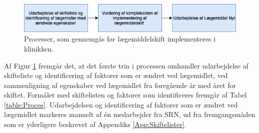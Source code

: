\begin{figure}[H]\centering	\includegraphics[width=1\textwidth]{billeder/proces.png} 
	\caption{Processer, som gennemgås før lægemiddelskift implementeres i klinikken.}\label{fig:Proces}  
\end{figure}

Af Figur \ref{fig:Proces} fremgår det, at det første trin i processen omhandler udarbejdelse af skifteliste og identificering af faktorer som er ændret ved lægemidlet, ved sammenligning af egenskaber ved lægemidlet fra foregående år med året for skiftet. Formålet med skiftelisten og faktorer som identificeres fremgår af Tabel \ref{table:Proces}. Udarbejdelsen og identificering af faktorer som er ændret ved lægemidlet markeres manuelt af én medarbejder fra SRN, ud fra fremgangsmåden som er yderligere beskrevet af Appendiks \ref{App:Skiftelister}.

